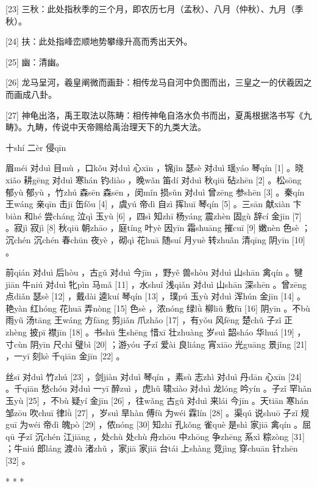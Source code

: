 \documentclass[12pt,UTF8]{ctexbook}
\begin{document}
[23] 三秋：此处指秋季的三个月，即农历七月（孟秋）、八月（仲秋）、九月（季秋）。

[24] 扶：此处指峰峦顺地势攀缘升高而秀出天外。

[25] 幽：清幽。

[26] 龙马呈河，羲皇阐微而画卦：相传龙马自河中负图而出，三皇之一的伏羲因之而画成八卦。

[27] 神龟出洛，禹王取法以陈畴：相传神龟自洛水负书而出，夏禹根据洛书写《九畴》。九畴，传说中天帝赐给禹治理天下的九类大法。





十shí 二èr 侵qīn


眉méi 对duì 目mù ，口kǒu 对duì 心xīn ，锦jǐn 瑟sè 对duì 瑶yáo 琴qín [1] 。晓xiǎo 耕gēng 对duì 寒hán 钓diào ，晚wǎn 笛dí 对duì 秋qiū 砧zhēn [2] 。松sōng 郁yù 郁yù ，竹zhú 森sēn 森sēn ，闵mǐn 损sǔn 对duì 曾zēng 参shēn [3] 。秦qín 王wáng 亲qīn 击jī 缶fǒu [4] ，虞yú 帝dì 自zì 挥huī 琴qín [5] 。三sān 献xiàn 卞biàn 和hé 尝cháng 泣qì 玉yù [6] ，四sì 知zhī 杨yáng 震zhèn 固gù 辞cí 金jīn [7] 。寂jì 寂jì [8] 秋qiū 朝zhāo ，庭tíng 叶yè 因yīn 霜shuāng 摧cuī [9] 嫩nèn 色sè ；沉chén 沉chén 春chūn 夜yè ，砌qì 花huā 随suí 月yuè 转zhuǎn 清qīng 阴yīn [10] 。

前qián 对duì 后hòu ，古gǔ 对duì 今jīn ，野yě 兽shòu 对duì 山shān 禽qín 。犍jiān 牛niú 对duì 牝pìn 马mǎ [11] ，水shuǐ 浅qiǎn 对duì 山shān 深shēn 。曾zēng 点diǎn 瑟sè [12] ，戴dài 逵kuí 琴qín [13] ，璞pú 玉yù 对duì 浑hún 金jīn [14] 。艳yàn 红hóng 花huā 弄nòng [15] 色sè ，浓nóng 绿lǜ 柳liǔ 敷fū [16] 阴yīn 。不bù 雨yǔ 汤tāng 王wáng 方fāng 剪jiǎn 爪zhǎo [17] ，有yǒu 风fēng 楚chǔ 子zǐ 正zhèng 披pī 襟jīn [18] 。书shū 生shēng 惜xī 壮zhuàng 岁suì 韶sháo 华huá [19] ，寸cùn 阴yīn 尺chǐ 璧bì [20] ；游yóu 子zǐ 爱ài 良liáng 宵xiāo 光guāng 景jǐng [21] ，一yī 刻kè 千qiān 金jīn [22] 。

丝sī 对duì 竹zhú [23] ，剑jiàn 对duì 琴qín ，素sù 志zhì 对duì 丹dān 心xīn [24] 。千qiān 愁chóu 对duì 一yī 醉zuì ，虎hǔ 啸xiào 对duì 龙lóng 吟yín 。子zǐ 罕hǎn 玉yù [25] ，不bù 疑yí 金jīn [26] ，往wǎng 古gǔ 对duì 来lái 今jīn 。天tiān 寒hán 邹zōu 吹chuī 律lǜ [27] ，岁suì 旱hàn 傅fù 为wéi 霖lín [28] 。渠qú 说shuō 子zǐ 规guī 为wéi 帝dì 魄pò [29] ，侬nóng [30] 知zhī 孔kǒng 雀què 是shì 家jiā 禽qín 。屈qū 子zǐ 沉chén 江jiāng ，处chù 处chù 舟zhōu 中zhōng 争zhēng 系xì 粽zòng [31] ；牛niú 郎láng 渡dù 渚zhǔ ，家jiā 家jiā 台tái 上shàng 竞jìng 穿chuān 针zhēn [32] 。



* * *
\end{document}
